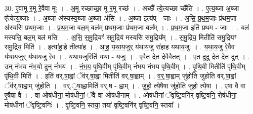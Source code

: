 \documentclass[17pt]{extarticle}
\begin{document}
30. ए॒वामू र॒मू रे॒वैवा मूः । . अ॒मू रच्छाच्छा॒ मू र॒मू रच्छ॑ । . अच्छै᳚ त्ये॒त्यच्छा च्छै॑ति । . ए॒त्य॒ब्जा अ॒ब्जा ए᳚त्येत्य॒ब्जाः । . अ॒ब्जा अ॑स्यस्य॒ब्जा अ॒ब्जा अ॑सि । . अ॒ब्जा इत्य॑प् - जाः । . अ॒सि॒ प्र॒थ॒म॒जाः प्र॑थम॒जा अ॑स्यसि प्रथम॒जाः । . प्र॒थ॒म॒जा बल॒म् बल॑म् प्रथम॒जाः प्र॑थम॒जा बल᳚म् । . प्र॒थ॒म॒जा इति॑ प्रथम - जाः । . बल॑ मस्यसि॒ बल॒म् बल॑ मसि । . अ॒सि॒ स॒मु॒द्रियꣳ॑ समु॒द्रिय॑ मस्यसि समु॒द्रिय᳚म् । . स॒मु॒द्रिय॒ मितीति॑ समु॒द्रियꣳ॑ समु॒द्रिय॒ मिति॑ । . इत्या॑हा॒हे तीत्या॑ह । . आ॒ह॒ य॒था॒य॒जुर् य॑थाय॒जु रा॑हाह यथाय॒जुः । . य॒था॒य॒जु रे॒वैव य॑थाय॒जुर् य॑थाय॒जु रे॒व । . य॒था॒य॒जुरिति॑ यथा - य॒जुः । . ए॒वैत दे॒त दे॒वैवैतत् । . ए॒त दुदु दे॒त दे॒त दुत् । . उन् नं॑भय नंभ॒यो दुन् नं॑भय । . नं॒भ॒य॒ पृ॒थि॒वीम् पृ॑थि॒वीम् नं॑भय नंभय पृथि॒वीम् । . पृ॒थि॒वी मितीति॑ पृथि॒वीम् पृ॑थि॒वी मिति॑ । . इति॑ वर्.षा॒ह्वां ॅव॑र्.षा॒ह्वा मितीति॑ वर्.षा॒ह्वाम् । . व॒र्॒.षा॒ह्वाम् जु॑होति जुहोति वर्.षा॒ह्वां ॅव॑र्.षा॒ह्वाम् जु॑होति । . व॒र्.॒षा॒ह्वामिति॑ वर्.ष - ह्वाम् । . जु॒हो॒ त्ये॒षैषा जु॑होति जुहो त्ये॒षा । . ए॒षा वै वा ए॒षैषा वै । . वा ओष॑धीना॒ मोष॑धीनां॒ ॅवै वा ओष॑धीनाम् । . ओष॑धीनां ॅवृष्टि॒वनि॑र् वृष्टि॒वनि॒ रोष॑धीना॒ मोष॑धीनां ॅवृष्टि॒वनिः॑ । . वृ॒ष्टि॒वनि॒ स्तया॒ तया॑ वृष्टि॒वनि॑र् वृष्टि॒वनि॒ स्तया᳚ । \newline
\end{document}
